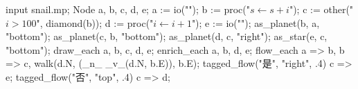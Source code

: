 \usemodule[zhfonts]

\startMPpage
input snail.mp;
Node a, b, c, d, e;
a := io("");
b := proc("$s\leftarrow s + i$");
c := other("$i > 100$", diamond(b));
d := proc("$i\leftarrow i + 1$");
e := io("");
as_planet(b, a, "bottom"); as_planet(c, b, "bottom");
as_planet(d, c, "right"); as_star(e, c, "bottom");
draw_each a, b, c, d, e;
enrich_each a, b, d, e;
flow_each a => b, b => c, walk(d.N, (_n_ _v_(d.N, b.E)), b.E);
tagged_flow("是", "right", .4) c => e;
tagged_flow("否", "top", .4) c => d;
\stopMPpage